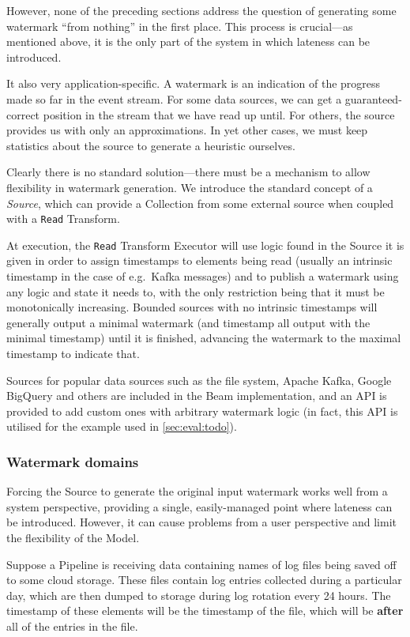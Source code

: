 However, none of the preceding sections address the question of generating some watermark ``from nothing'' in the first place.
This process is crucial---as mentioned above, it is the only part of the system in which lateness can be introduced.

It also very application-specific.
A watermark is an indication of the progress made so far in the event stream.
For some data sources, we can get a guaranteed-correct position in the stream that we have read up until.
For others, the source provides us with only an approximations.
In yet other cases, we must keep statistics about the source to generate a heuristic ourselves.

Clearly there is no standard solution---there must be a mechanism to allow flexibility in watermark generation.
We introduce the standard concept of a \emph{Source}, which can provide a Collection from some external source when coupled with a \verb|Read| Transform.

At execution, the \verb|Read| Transform Executor will use logic found in the Source it is given in order to assign timestamps to elements being read (usually an intrinsic timestamp in the case of e.g.\ Kafka messages) and to publish a watermark using any logic and state it needs to, with the only restriction being that it must be monotonically increasing.
Bounded sources with no intrinsic timestamps will generally output a minimal watermark (and timestamp all output with the minimal timestamp) until it is finished, advancing the watermark to the maximal timestamp to indicate that.

Sources for popular data sources such as the file system, Apache Kafka, Google BigQuery and others are included in the Beam implementation, and an API is provided to add custom ones with arbitrary watermark logic (in fact, this API is utilised for the example used in \cref{sec:eval:todo}).

\subsubsection{Watermark domains}

Forcing the Source to generate the original input watermark works well from a system perspective, providing a single, easily-managed point where lateness can be introduced.
However, it can cause problems from a user perspective and limit the flexibility of the Model.

Suppose a Pipeline is receiving data containing names of log files being saved off to some cloud storage.
These files contain log entries collected during a particular day, which are then dumped to storage during log rotation every 24 hours.
The timestamp of these elements will be the timestamp of the file, which will be \textbf{after} all of the entries in the file.


